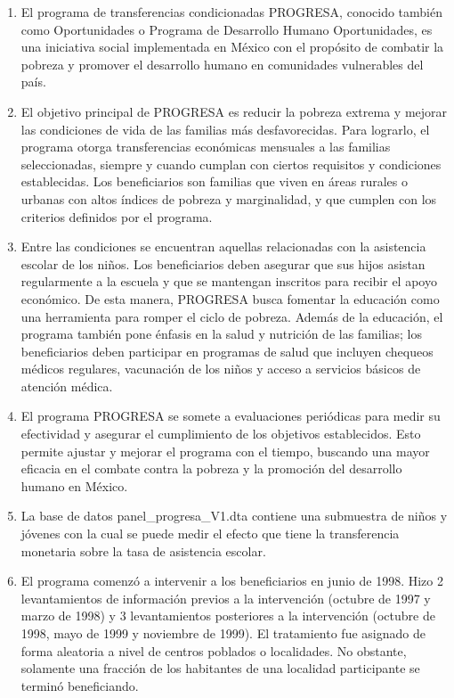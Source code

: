 \documentclass[12pt]{article}
\begin{document}
\begin{enumerate}

\item El programa de transferencias condicionadas PROGRESA, conocido también como Oportunidades o Programa de Desarrollo Humano Oportunidades, es una iniciativa social implementada en México con el propósito de combatir la pobreza y promover el desarrollo humano en comunidades vulnerables del país. 

\item El objetivo principal de PROGRESA es reducir la pobreza extrema y mejorar las condiciones de vida de las familias más desfavorecidas. Para lograrlo, el programa otorga transferencias económicas mensuales a las familias seleccionadas, siempre y cuando cumplan con ciertos requisitos y condiciones establecidas. Los beneficiarios son familias que viven en áreas rurales o urbanas con altos índices de pobreza y marginalidad, y que cumplen con los criterios definidos por el programa. 


\item Entre las condiciones se encuentran aquellas relacionadas con la asistencia escolar de los niños. Los beneficiarios deben asegurar que sus hijos asistan regularmente a la escuela y que se mantengan inscritos para recibir el apoyo económico. De esta manera, PROGRESA busca fomentar la educación como una herramienta para romper el ciclo de pobreza. Además de la educación, el programa también pone énfasis en la salud y nutrición de las familias; los beneficiarios deben participar en programas de salud que incluyen chequeos médicos regulares, vacunación de los niños y acceso a servicios básicos de atención médica. 

\item El programa PROGRESA se somete a evaluaciones periódicas para medir su efectividad y asegurar el cumplimiento de los objetivos establecidos. Esto permite ajustar y mejorar el programa con el tiempo, buscando una mayor eficacia en el combate contra la pobreza y la promoción del desarrollo humano en México. 


\item La base de datos panel\_progresa\_V1.dta contiene una submuestra de niños y jóvenes con la cual se puede medir el efecto que tiene la transferencia monetaria sobre la tasa de asistencia escolar. 

\item El programa comenzó a intervenir a los beneficiarios en junio de 1998. Hizo 2 levantamientos de información previos a la intervención (octubre de 1997 y marzo de 1998) y 3 levantamientos posteriores a la intervención (octubre de 1998, mayo de 1999 y noviembre de 1999). El tratamiento fue asignado de forma aleatoria a nivel de
centros poblados o localidades. No obstante, solamente una fracción de los habitantes de una localidad participante se terminó beneficiando. 



\end{enumerate}
\end{document}
